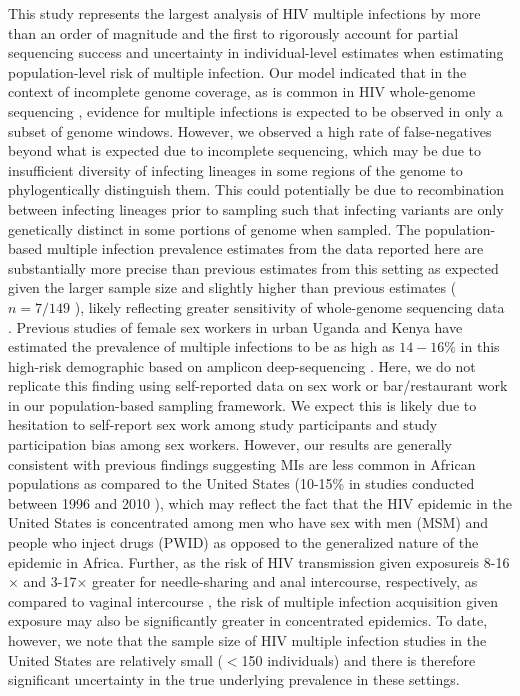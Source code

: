 \documentclass[10pt,letterpaper]{article}
\begin{document}
This study represents the largest analysis of HIV multiple infections by more than an order of magnitude \cite{yuan2024} and the first to rigorously account for partial sequencing success and uncertainty in individual-level estimates when estimating population-level risk of multiple infection. Our model indicated that in the context of incomplete genome coverage, as is common in HIV whole-genome sequencing \cite{bonsall2020}, evidence for multiple infections is expected to be observed in only a subset of genome windows. However, we observed a high rate of false-negatives beyond what is expected due to incomplete sequencing, which may be due to insufficient diversity of infecting lineages in some regions of the genome \cite{patino2017} to phylogentically distinguish them. This could potentially be due to recombination between infecting lineages prior to sampling \cite{shriner2004, song2018} such that infecting variants are only genetically distinct in some portions of genome when sampled. The population-based multiple infection prevalence estimates from the data reported here are substantially more precise than previous estimates from this setting as expected given the larger sample size and slightly higher than previous estimates ($n=7/149$ \cite{redd2012}), likely reflecting greater sensitivity of whole-genome sequencing data . Previous studies of female sex workers in urban Uganda and Kenya have estimated the prevalence of multiple infections to be as high as $14-16\%$ in this high-risk demographic based on amplicon deep-sequencing \cite{ronen2013,redd2014}. Here, we do not replicate this finding using self-reported data on sex work or bar/restaurant work in our population-based sampling framework. We expect this is likely due to hesitation to self-report sex work among study participants and study participation bias among sex workers. However, our results are generally consistent with previous findings suggesting MIs are less common in African populations as compared to the United States (10-15\% in studies conducted between 1996 and 2010 \cite{pacold2012,wagner2013,wagner2014,wagner2016,vesa2017}), which may reflect the fact that the HIV epidemic in the United States is concentrated among men who have sex with men (MSM) and people who inject drugs (PWID) as opposed to the generalized nature of the epidemic in Africa. Further, as the risk of HIV transmission given exposureis 8-16$\times$ and 3-17$\times$ greater for needle-sharing and anal intercourse, respectively, as compared to vaginal intercourse \cite{patel2014}, the risk of multiple infection acquisition given exposure may also be significantly greater in concentrated epidemics. To date, however, we note that the sample size of HIV multiple infection studies in the United States are relatively small ($<$150 individuals) and there is therefore significant uncertainty in the true underlying prevalence in these settings. \par
\end{document}
